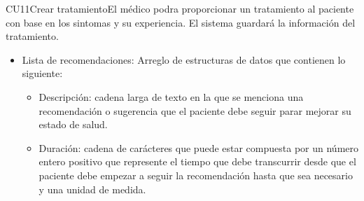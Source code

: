 \begin{UseCase}{CU11}{Crear tratamiento}{El médico podra proporcionar un tratamiento al paciente con base en los sintomas y su experiencia. El sistema guardará la información del tratamiento.}
{\begin{itemize}
\begin{itemize}
        \end{itemize}   
      \item Lista de recomendaciones: Arreglo de estructuras de datos que contienen lo siguiente:
        \begin{itemize}
          \item Descripción: cadena larga de texto en la que se menciona una recomendación o sugerencia que el paciente debe seguir parar mejorar su estado de salud.
          \item Duración: cadena de carácteres que puede estar compuesta por un número entero positivo que represente el tiempo que debe transcurrir desde que el paciente debe empezar a seguir la recomendación hasta que sea necesario y una unidad de medida. 
        \end{itemize}   
    \end{itemize}
  }
\end{UseCase}

